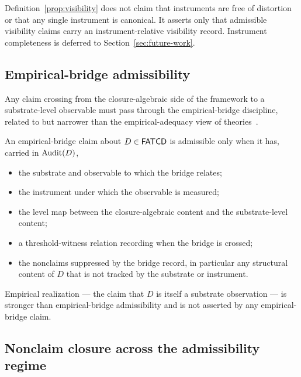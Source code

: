 \begin{remark}\label{rem:no-instrument-free}
Definition~\ref{prop:visibility} does not claim that instruments are
free of distortion or that any single instrument is canonical. It asserts only that admissible visibility claims carry an instrument-relative
visibility record. Instrument completeness is deferred to
Section~\ref{sec:future-work}.
\end{remark}

\subsection{Empirical-bridge admissibility}\label{subsec:empirical-bridge}

Any claim crossing from the closure-algebraic side of the framework
to a substrate-level observable must pass through the
empirical-bridge discipline, related to but narrower than
the empirical-adequacy view of theories~\citep{vanFraassen1980}.

\begin{definition}\label{prop:empirical-bridge}
An empirical-bridge claim about \(D \in \mathsf{FATCD}{}\) is admissible only when
it has, carried in \(\operatorname{Audit}\!\left(D\right)\),
\begin{itemize}[topsep=2pt,itemsep=1pt]
  \item the substrate and observable to which the bridge relates;
  \item the instrument under which the observable is measured;
  \item the level map between the closure-algebraic content and the
    substrate-level content;
  \item a threshold-witness relation recording when the bridge is
    crossed;
  \item the nonclaims suppressed by the bridge record, in particular any
    structural content of \(D\) that is not tracked by the substrate or
    instrument.
\end{itemize}
Empirical realization --- the claim that \(D\) is itself a substrate
observation --- is stronger than empirical-bridge admissibility and is
not asserted by any empirical-bridge claim.
\end{definition}


\subsection{Nonclaim closure across the admissibility regime}\label{subsec:nonclaim-closure}


